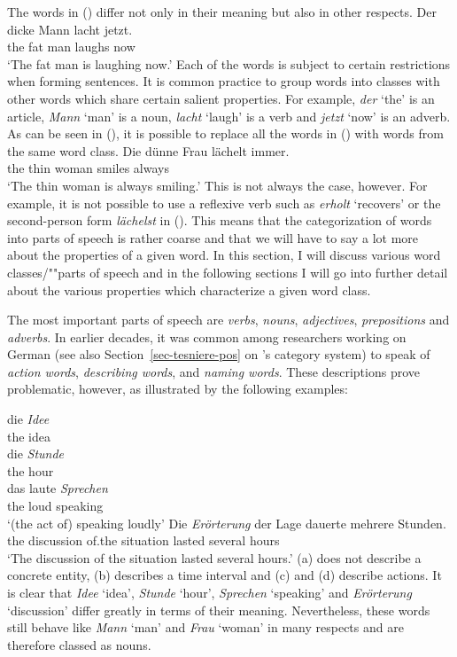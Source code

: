 {The words in () differ not only in their meaning but also in other respects.
\ea
\gll Der dicke Mann lacht jetzt.\\
	 the fat man laughs now\\
\glt `The fat man is laughing now.'
\z
Each of the words is subject to certain restrictions when forming sentences. It is common practice to group words into classes with
other words which share certain salient properties. For example, \emph{der} `the' is an article, \emph{Mann} `man' is a noun,
\emph{lacht} `laugh' is a verb and \emph{jetzt} `now' is an adverb. As can
be seen in (), it is possible to replace all the words
in () with words from the same word class.
\ea
\gll Die dünne Frau lächelt immer.\\
	 the thin woman smiles always\\
\glt `The thin woman is always smiling.'
\z
This is not always the case, however. For example, it is not possible to use a reflexive verb such as \emph{erholt} `recovers' or the second-person form
\emph{lächelst} in (). This means that the categorization of words into parts of speech is
rather coarse and that we will have to say a lot more about the properties of a given word. In this
section, I will discuss various word classes/""parts of speech and in the following sections I will
go into further detail about the various properties which characterize a given word class.

The most important parts of speech are \emph{verbs}, \emph{nouns}, \emph{adjectives}, \emph{prepositions} and
\emph{adverbs}. In earlier decades, it was
common among researchers working on German (see also Section~\ref{sec-tesniere-pos} on \tes's category system) to
speak of \emph{action words}, \emph{describing words}, and \emph{naming words}. These descriptions prove problematic, however, as illustrated by the following examples:


\eal
\ex 
\gll die \emph{Idee}\\
	the idea\\
\ex 
\gll die \emph{Stunde}\\
	 the hour\\
\ex 
\gll das laute \emph{Sprechen}\\
     the loud speaking\\
\glt `(the act of) speaking loudly'
\ex 
\gll Die \emph{Erörterung} der Lage dauerte mehrere Stunden.\\
     the discussion of.the situation lasted several hours\\
\glt `The discussion of the situation lasted several hours.'
\zl
(a) does not describe a concrete entity, (b) describes a time interval and (c) and (d)
describe actions. It is clear that \emph{Idee} `idea', \emph{Stunde} `hour', \emph{Sprechen}
`speaking' and \emph{Erörterung} `discussion' differ greatly in terms of their
meaning. Nevertheless, these words still behave like \emph{Mann} `man' and \emph{Frau} `woman' in many respects
and are therefore classed as nouns.

}
